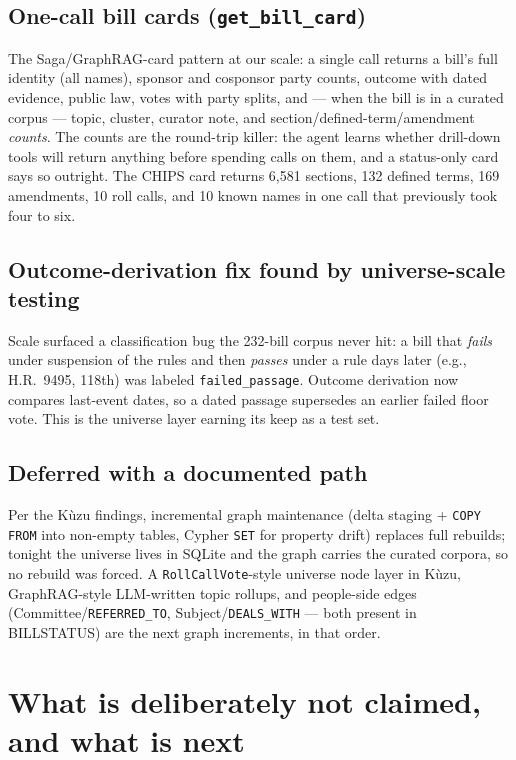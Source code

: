 \documentclass[11pt]{article}
\newcommand{\code}[1]{\texttt{#1}}
\begin{document}
\subsection{One-call bill cards (\code{get\_bill\_card})}

The Saga/GraphRAG-card pattern at our scale: a single call returns a
bill's full identity (all names), sponsor and cosponsor party counts,
outcome with dated evidence, public law, votes with party splits, and
--- when the bill is in a curated corpus --- topic, cluster, curator
note, and section/defined-term/amendment \emph{counts}. The counts are
the round-trip killer: the agent learns whether drill-down tools will
return anything before spending calls on them, and a status-only card
says so outright. The CHIPS card returns 6{,}581 sections, 132 defined
terms, 169 amendments, 10 roll calls, and 10 known names in one call
that previously took four to six.

\subsection{Outcome-derivation fix found by universe-scale testing}

Scale surfaced a classification bug the 232-bill corpus never hit: a
bill that \emph{fails} under suspension of the rules and then
\emph{passes} under a rule days later (e.g., H.R.~9495, 118th) was
labeled \code{failed\_passage}. Outcome derivation now compares
last-event dates, so a dated passage supersedes an earlier failed floor
vote. This is the universe layer earning its keep as a test set.

\subsection{Deferred with a documented path}

Per the K\`uzu findings, incremental graph maintenance (delta staging +
\code{COPY FROM} into non-empty tables, Cypher \code{SET} for property
drift) replaces full rebuilds; tonight the universe lives in SQLite and
the graph carries the curated corpora, so no rebuild was forced. A
\code{RollCallVote}-style universe node layer in K\`uzu, GraphRAG-style
LLM-written topic rollups, and people-side edges
(Committee/\code{REFERRED\_TO}, Subject/\code{DEALS\_WITH} --- both
present in BILLSTATUS) are the next graph increments, in that order.

\section{What is deliberately not claimed, and what is next}
\end{document}
